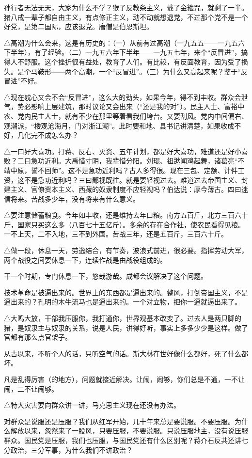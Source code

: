 孙行者无法无天，大家为什么不学？猴子反教条主义，戴了金箍咒，就剩了一半。猪八戒一辈子都自由主义，有点修正主义，动不动就想退党，不过那个党不是一个好党，是第二国际，应该退党。唐僧是伯恩斯坦。

△高潮为什么会来，这是有历史的：（一）从前有过高潮（一九五五——一九五六下半年），有了经验。（二）一九五六年下半年——一九五七年，来个“反冒进”，搞得人不舒服。这个挫折很有益处，教育了人们。有比较，有反面教育，因为受了损失。是个马鞍形——两个高潮，一个“反冒进”。（三）为什么又高起来呢？鉴于“反冒进”不好。

△现在躭心又会不会“反冒进”，这么大的劲头，如果今年，得不到丰收。群众会泄气，势必影响上层建筑，那时议论又会出来（“还是我的对”）。民主人士、富裕中农、党内民主人士，就有不少在那里等着看我们垮台。又要刮风。党内中间偏右、观潮派，“楼观沧海月，门对浙江潮”。此时要和地、县书记讲清楚，如果收成不好，几化完不成怎么办？

△一曰好大喜功。打蒋、反右、灭资、五年计划，都是好大喜功，难道还是好小喜败？二曰急功近利。大禹惜寸阴，我辈惜分阳。刘琨、祖逖闻鸡起舞，诸葛亮“不靖中原，誓不回师”。这不是急功近利吗？古人多得很。现在三包、定额、计件工资，这不是急功近利吗？三曰鄙视既往。就是要轻视过去。难道过去帝国主义、封建主义、官僚资本主义、西藏的奴隶制度不应轻视吗？伯达说：厚今薄古。四曰迷信将来。苦战多少年，没有将来有什么意义。

△要注意储蓄粮食。今年如丰收，还是维持去年口粮。南方五百斤，北方三百六十斤，国家只买这么多（八百七十五亿斤）。多余的存在合作社，使农民看得见粮。一不上天，二不入地，三不到外国。苦战三年，还是五百斤，三百六十斤。

△做一段，休息一天，劳逸结合，有节奏，波浪式前进，很必要。指挥劳动大军，两个战役之间要休息一下，连续作战是由战役组成的。

干一个时期，专门休息一下，悠哉游哉。成都会议解决了这个问题。

技术革命是被逼出来的。世界上的东西都是逼出来的。整风，打倒帝国主义，不是逼出来的？孔明的木牛流马也是逼出来的。一个对立物，把你一逼就逼出来了。

△大鸣大放，干部我压服你，我打通你，世界观基本改变了。过去人是两只脚的猪，是奴隶主与奴隶的关系，说是人民，讲得好听，事实上多多少少是这样。做了官都有那么点官架子。

从古以来，不听个人的话，只听空气的话。斯大林在世好像什么都好，死了什么都坏。

凡是乱得厉害（的地方），问题就接近解决。让闹，闹够，你们总是不通，一不让闹，二不让闹够。

△特大灾害要向群众讲一讲，马克思主义现在还没有办法。

对群众是说服还是压服？我们从红军开始，几十年来总是要说服。不要压服。为什么解放以来，忽然来了一股风，只要压服，不要说服。只说压服地主，没有说压服群众。国民党是压服，我们也压服，与国民党还有什么区别呢？蒋介石反共还讲七分政治，三分军事，为什么我们不讲政治？

